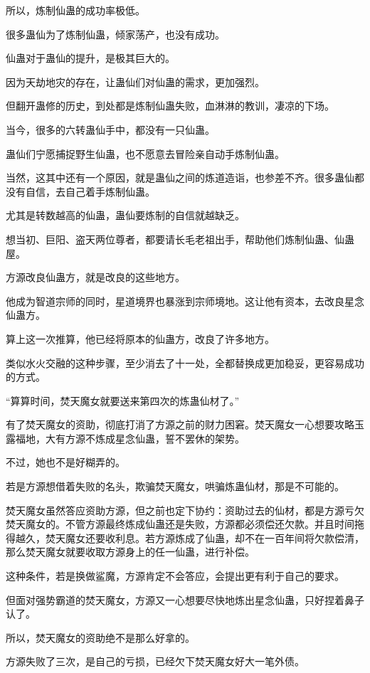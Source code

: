 \begin{this_body}
所以，炼制仙蛊的成功率极低。

很多蛊仙为了炼制仙蛊，倾家荡产，也没有成功。

仙蛊对于蛊仙的提升，是极其巨大的。

因为天劫地灾的存在，让蛊仙们对仙蛊的需求，更加强烈。

但翻开蛊修的历史，到处都是炼制仙蛊失败，血淋淋的教训，凄凉的下场。

当今，很多的六转蛊仙手中，都没有一只仙蛊。

蛊仙们宁愿捕捉野生仙蛊，也不愿意去冒险亲自动手炼制仙蛊。

当然，这其中还有一个原因，就是蛊仙之间的炼道造诣，也参差不齐。很多蛊仙都没有自信，去自己着手炼制仙蛊。

尤其是转数越高的仙蛊，蛊仙要炼制的自信就越缺乏。

想当初、巨阳、盗天两位尊者，都要请长毛老祖出手，帮助他们炼制仙蛊、仙蛊屋。

方源改良仙蛊方，就是改良的这些地方。

他成为智道宗师的同时，星道境界也暴涨到宗师境地。这让他有资本，去改良星念仙蛊方。

算上这一次推算，他已经将原本的仙蛊方，改良了许多地方。

类似水火交融的这种步骤，至少消去了十一处，全都替换成更加稳妥，更容易成功的方式。

“算算时间，焚天魔女就要送来第四次的炼蛊仙材了。”

有了焚天魔女的资助，彻底打消了方源之前的财力困窘。焚天魔女一心想要攻略玉露福地，大有方源不炼成星念仙蛊，誓不罢休的架势。

不过，她也不是好糊弄的。

若是方源想借着失败的名头，欺骗焚天魔女，哄骗炼蛊仙材，那是不可能的。

焚天魔女虽然答应资助方源，但之前也定下协约：资助过去的仙材，都是方源亏欠焚天魔女的。不管方源最终炼成仙蛊还是失败，方源都必须偿还欠款。并且时间拖得越久，焚天魔女还要收利息。若方源炼成了仙蛊，却不在一百年间将欠款偿清，那么焚天魔女就要收取方源身上的任一仙蛊，进行补偿。

这种条件，若是换做鲨魔，方源肯定不会答应，会提出更有利于自己的要求。

但面对强势霸道的焚天魔女，方源又一心想要尽快地炼出星念仙蛊，只好捏着鼻子认了。

所以，焚天魔女的资助绝不是那么好拿的。

方源失败了三次，是自己的亏损，已经欠下焚天魔女好大一笔外债。


\end{this_body}
